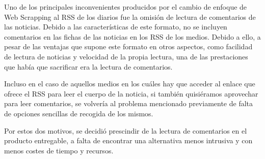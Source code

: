 Uno de los principales inconvenientes producidos por el cambio de enfoque de Web Scrapping al RSS de los diarios fue la omisión de lectura de comentarios de las noticias. Debido a las características de este formato, no se incluyen comentarios en las fichas de las noticias en los RSS de los medios. Debido a ello, a pesar de las ventajas que supone este formato en otros aspectos, como facilidad de lectura de noticias y velocidad de la propia lectura, una de las prestaciones que había que sacrificar era la lectura de comentarios.

Incluso en el caso de aquellos medios en los cuáles hay que acceder al enlace que ofrece el RSS para leer el cuerpo de la noticia, si también quisiéramos aprovechar para leer comentarios, se volvería al problema mencionado previamente de falta de opciones sencillas de recogida de los mismos.


Por estos dos motivos, se decidió prescindir de la lectura de comentarios en el producto entregable, a falta de encontrar una alternativa menos intrusiva y con menos costes de tiempo y recursos.